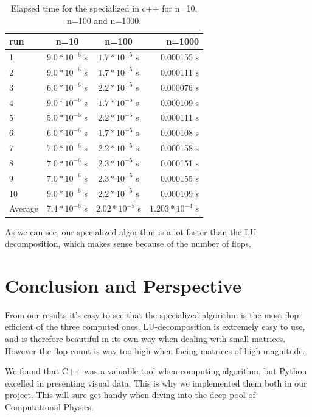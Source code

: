\documentclass[%
oneside,                 %
final,                   %
10pt]{article}
\begin{document}
\begin{table}[H]
    \centering
    \begin{tabular}{|l|c|c|r|}
    \hline
     run & n=10 & n=100 & n=1000\\
     \hline
      1  & $9.0*10^{-6}$ s & $1.7*10^{-5}$ s & 0.000155 s\\
      2  & $9.0*10^{-6}$ s & $1.7*10^{-5}$ s & 0.000111 s\\
      3  & $6.0*10^{-6}$ s & $2.2*10^{-5}$ s & $0.000076$ s\\
      4  & $9.0*10^{-6}$ s& $1.7*10^{-5}$ s & 0.000109 s\\
      5  & $5.0*10^{-6}$ s& $2.2*10^{-5}$ s & 0.000111 s\\
      6  & $6.0*10^{-6}$ s& $1.7*10^{-5}$ s  & 0.000108 s\\
      7  & $7.0*10^{-6}$ s & $2.2*10^{-5}$ s & 0.000158 s\\
      8  & $7.0*10^{-6}$ s & $2.3*10^{-5}$ s & 0.000151 s\\
      9  & $7.0*10^{-6}$ s & $2.3*10^{-5}$ s  & 0.000155 s\\
      10 & $9.0*10^{-6}$ s & $2.2*10^{-5}$ s & 0.000109 s\\
      \hline
      Average & $7.4*10^{-6}$ s & $2.02*10^{-5}$ s & $1.203*10^{-4}$ s\\
      \hline
    \end{tabular}
    \caption{Elapsed time for the specialized in c++ for n=10, n=100 and n=1000.}
    \label{tab:my_label}
\end{table}

As we can see, our specialized algorithm is a lot faster than the LU decomposition, which makes sense because of the number of flops.


\section{Conclusion and Perspective}

From our results it's easy to see that the specialized algorithm is the most flop-efficient of the three computed ones. LU-decomposition is extremely easy to use, and is therefore beautiful in its own way when dealing with small matrices. However the flop count is way too high when facing matrices of high magnitude.

We found that C++ was a valuable tool when computing algorithm, but Python excelled in presenting visual data. This is why we implemented them both in our project. This will sure get handy when diving into the deep pool of Computational Physics.
\end{document}
